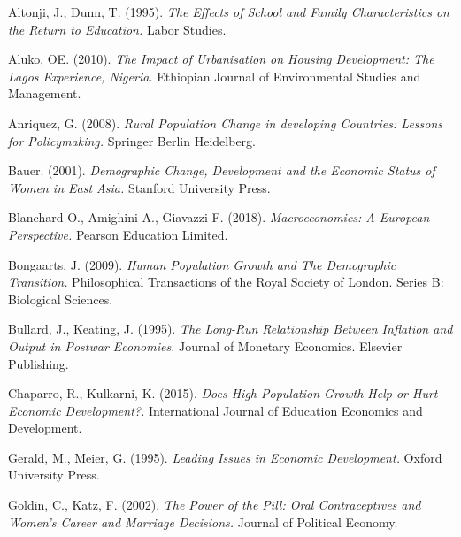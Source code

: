 \documentclass[11pt, english]{article}
\begin{document}
	\begin{thebibliography}{9}

               	Altonji, J., Dunn, T. (1995).  
		\textsl{The Effects of School and Family Characteristics on the Return to Education.}
		Labor Studies.
			
                Aluko, OE. (2010).                                     
                \textsl{The Impact of Urbanisation on Housing Development: The Lagos Experience, Nigeria.}                                              
      		Ethiopian Journal of Environmental Studies and Management.
	
                Anriquez, G. (2008).
                \textsl{Rural Population Change in developing Countries: Lessons for Policymaking.}                                              
      		Springer Berlin Heidelberg.
	
                Bauer. (2001).
		\textsl{Demographic Change, Development and the Economic Status of Women in East Asia.}
		Stanford University Press.
			
                Blanchard O., Amighini A., Giavazzi F. (2018).
                \textsl{Macroeconomics: A European Perspective.}
      		Pearson Education Limited.
	
                Bongaarts, J. (2009).           
                \textsl{Human Population Growth and The Demographic Transition.}
     		Philosophical Transactions of the Royal Society of London. Series B: Biological Sciences. 

                Bullard, J., Keating, J. (1995).
		\textsl{The Long-Run Relationship Between Inflation and Output in Postwar Economies.}
		Journal of Monetary Economics. Elsevier Publishing.
			
                Chaparro, R., Kulkarni, K. (2015).
                \textsl{Does High Population Growth Help or Hurt Economic Development?.}
      		International Journal of Education Economics and Development.
	
                Gerald, M., Meier, G. (1995).
                \textsl{Leading Issues in Economic Development.}
     		Oxford University Press. 
	
                Goldin, C., Katz, F. (2002).             
                \textsl{The Power of the Pill: Oral Contraceptives and Women’s Career and Marriage Decisions.}                                            
      		Journal of Political Economy.


\end{thebibliography}
\end{document}
